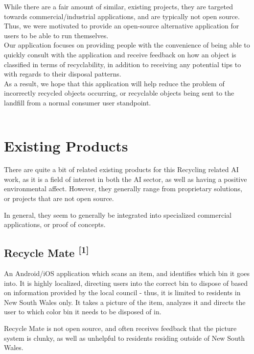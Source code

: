 \documentclass[conference]{IEEEtran}
\begin{document}
While there are a fair amount of similar, existing projects, they are targeted towards commercial/industrial applications, and are typically not open source. Thus, we were motivated to provide an open-source alternative application for users to be able to run themselves.\\

Our application focuses on providing people with the convenience of being able to quickly consult with the application and receive feedback on how an object is classified in terms of recyclability, in addition to receiving any potential tips to with regards to their disposal patterns. \\
As a result, we hope that this application will help reduce the problem of incorrectly recycled objects occurring, or recyclable objects being sent to the landfill from a normal consumer user standpoint. \\~\\

\section{Existing Products}

There are quite a bit of related existing products for this Recycling related AI work, as it is a field of interest in both the AI sector, as well as having a positive environmental affect. However, they generally range from proprietary solutions, or projects that are not open source.

In general, they seem to generally be integrated into specialized commercial applications, or proof of concepts.
\newline

\subsection{Recycle Mate \textsuperscript{[1]}}

An Android/iOS application which scans an item, and identifies which bin it goes into. It is highly localized, directing users into the correct bin to dispose of based on information provided by the local council - thus, it is limited to residents in New South Wales only. It takes a picture of the item, analyzes it and directs the user to which color bin it needs to be disposed of in.

Recycle Mate is not open source, and often receives feedback that the picture system is clunky, as well as unhelpful to residents residing outside of New South Wales.
\newline
\end{document}
